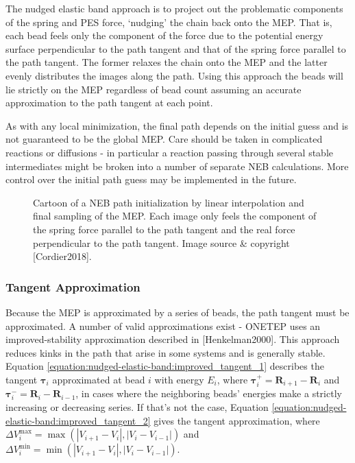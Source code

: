 \documentclass[letterpaper,10pt,english]{sphinxmanual}
\begin{document}
The nudged elastic band approach is to project out the problematic
components of the spring and PES force, ‘nudging’ the chain back onto
the MEP. That is, each bead feels only the component of the force due to
the potential energy surface perpendicular to the path tangent and that
of the spring force parallel to the path tangent. The former relaxes the
chain onto the MEP and the latter evenly distributes the images along
the path. Using this approach the beads will lie strictly on the MEP
regardless of bead count assuming an accurate approximation to the path
tangent at each point.

As with any local minimization, the final path depends on the initial
guess and is not guaranteed to be the global MEP. Care should be taken
in complicated reactions or diffusions - in particular a reaction
passing through several stable intermediates might be broken into a
number of separate NEB calculations. More control over the initial path
guess may be implemented in the future.

\begin{figure}[htbp]
\centering
\capstart

\noindent{}
\caption{Cartoon of a NEB path initialization by linear interpolation and final sampling of the MEP. Each image only feels the component of the spring force parallel to the path tangent and the real force perpendicular to the path tangent. Image source \& copyright {[}Cordier2018{]}.}\label{\detokenize{nudged-elastic-band:neb-example}}\label{\detokenize{nudged-elastic-band:id5}}\end{figure}


\subsubsection{Tangent Approximation}
\label{\detokenize{nudged-elastic-band:tangent-approximation}}
Because the MEP is approximated by a series of beads, the path tangent
must be approximated. A number of valid approximations exist - ONETEP
uses an improved-stability approximation described
in {[}Henkelman2000{]}. This approach reduces kinks
in the path that arise in some systems and is generally stable.
Equation \eqref{equation:nudged-elastic-band:improved_tangent_1} describes the tangent
\(\boldsymbol{\tau}_i\) approximated at bead \(i\) with energy
\(E_i\), where
\(\boldsymbol{\tau}_i^+=\mathbf{R}_{i+1}-\mathbf{R}_{i}\) and
\(\boldsymbol{\tau}_i^-=\mathbf{R}_{i}-\mathbf{R}_{i-1}\), in cases
where the neighboring beads’ energies make a strictly increasing or
decreasing series. If that’s not the case,
Equation \eqref{equation:nudged-elastic-band:improved_tangent_2} gives the tangent approximation,
where
\(\Delta V_i^\mathrm{max}=\max{\left(\left|V_{i+1}-V_i\right|,\left|V_{i}-V_{i-1}\right|\right)}\)
and
\(\Delta V_i^\mathrm{min}=\min{\left(\left|V_{i+1}-V_i\right|,\left|V_{i}-V_{i-1}\right|\right)}\).
\end{document}
